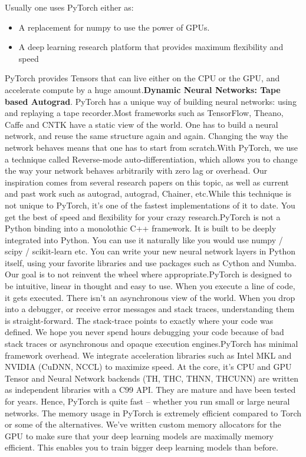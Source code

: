 \noindent Usually one uses PyTorch either as:
\begin{itemize}
	\item A replacement for numpy to use the power of GPUs.
	\item A deep learning research platform that provides maximum flexibility and speed
\end{itemize}

\noindent PyTorch provides Tensors that can live either on the CPU or the GPU, and accelerate compute by a huge amount.\textbf{Dynamic Neural Networks: Tape based Autograd}. PyTorch has a unique way of building neural networks: using and replaying a tape recorder.Most frameworks such as TensorFlow, Theano, Caffe and CNTK have a static view of the world. One has to build a neural network, and reuse the same structure again and again. Changing the way the network behaves means that one has to start from scratch.With PyTorch, we use a technique called Reverse-mode auto-differentiation, which allows you to change the way your network behaves arbitrarily with zero lag or overhead. Our inspiration comes from several research papers on this topic, as well as current and past work such as autograd, autograd, Chainer, etc.While this technique is not unique to PyTorch, it’s one of the fastest implementations of it to date. You get the best of speed and flexibility for your crazy research.PyTorch is not a Python binding into a monolothic C++ framework. It is built to be deeply integrated into Python. You can use it naturally like you would use numpy / scipy / scikit-learn etc. You can write your new neural network layers in Python itself, using your favorite libraries and use packages such as Cython and Numba. Our goal is to not reinvent the wheel where appropriate.PyTorch is designed to be intuitive, linear in thought and easy to use. When you execute a line of code, it gets executed. There isn’t an asynchronous view of the world. When you drop into a debugger, or receive error messages and stack traces, understanding them is straight-forward. The stack-trace points to exactly where your code was defined. We hope you never spend hours debugging your code because of bad stack traces or asynchronous and opaque execution engines.PyTorch has minimal framework overhead. We integrate acceleration libraries such as Intel MKL and NVIDIA (CuDNN, NCCL) to maximize speed. At the core, it’s CPU and GPU Tensor and Neural Network backends (TH, THC, THNN, THCUNN) are written as independent libraries with a C99 API.
They are mature and have been tested for years.
Hence, PyTorch is quite fast – whether you run small or large neural networks.
The memory usage in PyTorch is extremely efficient compared to Torch or some of the alternatives. We’ve written custom memory allocators for the GPU to make sure that your deep learning models are maximally memory efficient. This enables you to train bigger deep learning models than before.

